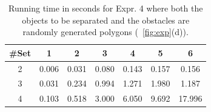 \begin{table}[ht]
    \centering
    \begin{tabular}{|c|c|c|c|c|c|c|}\hline
         \#Set&  1 & 2 & 3 & 4& 5& 6\\\hline
2& 0.006 & 0.031 & 0.080 & 0.143 & 0.157 & 0.156 \\\hline
3& 0.031 & 0.234 & 0.994 & 1.271 & 1.980 & 1.187 \\\hline
4& 0.103 & 0.518 & 3.000 & 6.050 & 9.692 & 17.996 \\\hline 
    \end{tabular}
    \caption{Running time in seconds for Expr. 4 where both the objects to be separated and the obstacles are randomly generated polygons (~\ref{fig:exp}(d)).
    }
    \label{tab:expr_4}
    \vspace{-2mm}
\end{table}